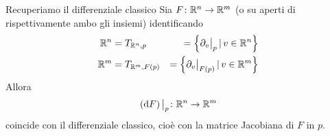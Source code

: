 \documentclass[a4paper]{article}
\begin{document}
\begin{snippetproposition}{Recuperiamo il differenziale classico}
    Sia \(F \colon \mathbb{R}^n \to \mathbb{R}^m\) (o su aperti di rispettivamente ambo gli insiemi)
    identificando \begin{align*}
        \realnumbers^n &= T_{\realnumbers^n, p} &= \left\{
            \restr{\partial_v}{p} \suchthat v \in \realnumbers^n
        \right\} \\
        \realnumbers^m &= T_{\realnumbers^m, F(p)} &= \left\{
            \restr{\partial_v}{F(p)} \suchthat v \in \realnumbers^m
        \right\}
    \end{align*}
    Allora \[
        \restr{\left(\text{d}F\right)}{p}
        \colon \realnumbers^n \fromto \realnumbers^m
    \]
    coincide con il differenziale classico, cioè con la matrice Jacobiana di \(F\) in \(p\).
\end{snippetproposition}
\end{document}
